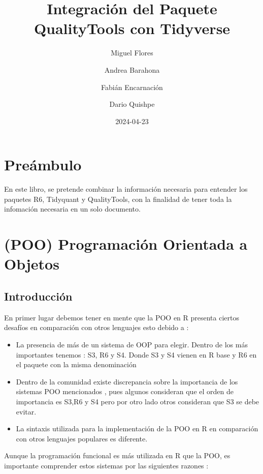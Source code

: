 \documentclass[
]{book}
\title{Integración del Paquete QualityTools con Tidyverse}
\author{Miguel Flores \and Andrea Barahona \and Fabián Encarnación \and Dario Quishpe}
\date{2024-04-23}
\begin{document}
\maketitle

{
\setcounter{tocdepth}{1}
\tableofcontents
}
\hypertarget{preuxe1mbulo}{%
\chapter{Preámbulo}\label{preuxe1mbulo}}

En este libro, se pretende combinar la información necesaria para entender los paquetes R6, Tidyquant y QualityTools, con la finalidad de tener toda la infomación necesaria en un solo documento.

\hypertarget{poo-programaciuxf3n-orientada-a-objetos}{%
\chapter{(POO) Programación Orientada a Objetos}\label{poo-programaciuxf3n-orientada-a-objetos}}

\hypertarget{introducciuxf3n}{%
\section{Introducción}\label{introducciuxf3n}}

En primer lugar debemos tener en mente que la POO en R presenta ciertos desafíos en comparación con otros lenguajes esto debido a :

\begin{itemize}
\item
  La presencia de más de un sistema de OOP para elegir. Dentro de los más importantes tenemos : S3, R6 y S4. Donde S3 y S4 vienen en R base y R6 en el paquete con la misma denominación
\item
  Dentro de la comunidad existe discrepancia sobre la importancia de los sistemas POO mencionados , pues algunos consideran que el orden de importancia es S3,R6 y S4 pero por otro lado otros consideran que S3 se debe evitar.
\item
  La sintaxis utilizada para la implementación de la POO en R en comparación con otros lenguajes populares es diferente.
\end{itemize}

Aunque la programación funcional es más utilizada en R que la POO, es importante comprender estos sistemas por las siguientes razones :
\end{document}
